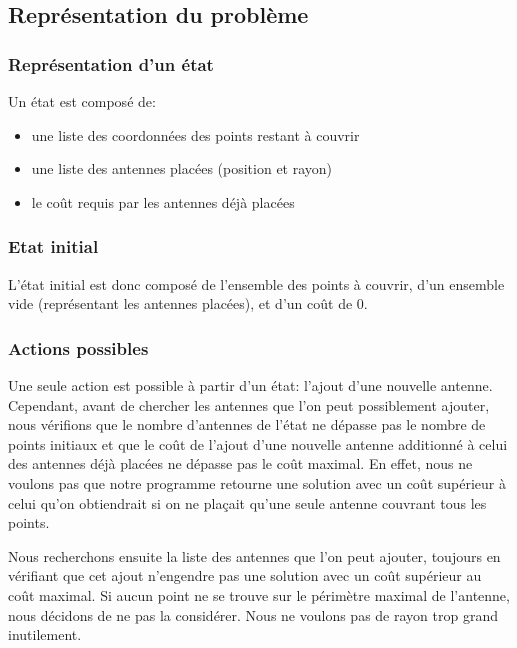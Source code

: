 \documentclass[12pt]{article}
\begin{document}
\subsection{Représentation du problème}

\subsubsection{Représentation d'un état}
Un état est composé de:
\begin{itemize}
	\item une liste des coordonnées des points restant à couvrir
	\item une liste des antennes placées (position et rayon)
	\item le coût requis par les antennes déjà placées
\end{itemize}

\subsubsection{Etat initial}
L'état initial est donc composé de l'ensemble des points à couvrir, d'un ensemble vide (représentant les antennes placées), et d'un coût de 0.

\subsubsection{Actions possibles}
Une seule action est possible à partir d'un état: l'ajout d'une nouvelle antenne.
Cependant, avant de chercher les antennes que l'on peut possiblement ajouter, nous vérifions que le nombre d'antennes de l'état ne dépasse pas le nombre de points initiaux et que le coût de l'ajout d'une nouvelle antenne additionné à celui des antennes déjà placées
ne dépasse pas le coût maximal. En effet, nous ne voulons pas que notre programme retourne une solution avec un coût supérieur à celui qu'on obtiendrait si on ne plaçait qu'une seule antenne couvrant tous les points.

Nous recherchons ensuite la liste des antennes que l'on peut ajouter, toujours en vérifiant que cet ajout n'engendre pas une solution avec un coût supérieur au coût maximal. Si aucun point ne se trouve sur le périmètre maximal de l'antenne, nous décidons de ne pas la considérer. Nous ne voulons pas de rayon trop grand inutilement.
\end{document}
